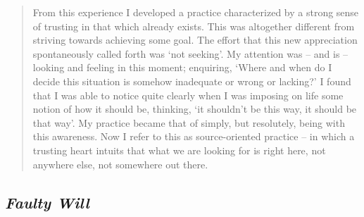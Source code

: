 \begin{quote}
From this experience I developed a practice characterized by a strong
sense of trusting in that which already exists. This was altogether
different from striving towards achieving some goal. The effort that
this new appreciation spontaneously called forth was `not seeking'. My
attention was -- and is -- looking and feeling in this moment;
enquiring, `Where and when do I decide this situation is somehow
inadequate or wrong or lacking?' I found that I was able to notice quite
clearly when I was imposing on life some notion of how it should be,
thinking, `it shouldn't be this way, it should be that way'. My practice
became that of simply, but resolutely, being with this awareness. Now I
refer to this as source-oriented practice -- in which a trusting heart
intuits that what we are looking for is right here, not anywhere else,
not somewhere out there.
\end{quote}

\hypertarget{faulty-will}{%
\subsection{\texorpdfstring{\emph{Faulty
Will}}{Faulty Will}}\label{faulty-will}}

